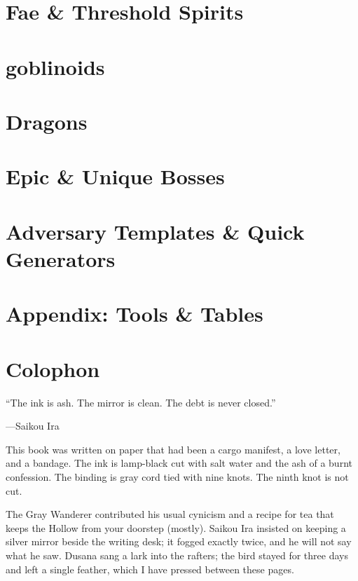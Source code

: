 \documentclass[10pt, twoside]{book}
\begin{document}
\chapter*{Fae \& Threshold Spirits}

\clearpage

\chapter*{goblinoids}

\clearpage


\chapter*{Dragons}

\clearpage


\chapter*{Epic \& Unique Bosses}

\clearpage

\chapter*{Adversary Templates \& Quick Generators}

\clearpage

\appendix
\chapter*{Appendix: Tools \& Tables}


\clearpage

\chapter*{Colophon}
\epigraph{``The ink is ash. The mirror is clean. The debt is never closed.''}{---Saikou Ira}

This book was written on paper that had been a cargo manifest, a love letter, and a bandage. The ink is lamp-black cut with salt water and the ash of a burnt confession. The binding is gray cord tied with nine knots. The ninth knot is not cut.

The Gray Wanderer contributed his usual cynicism and a recipe for tea that keeps the Hollow from your doorstep (mostly). Saikou Ira insisted on keeping a silver mirror beside the writing desk; it fogged exactly twice, and he will not say what he saw. Dusana sang a lark into the rafters; the bird stayed for three days and left a single feather, which I have pressed between these pages.
\end{document}
